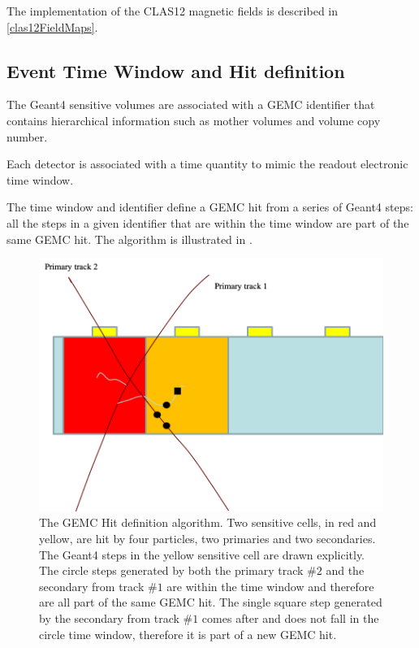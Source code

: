 The implementation of the CLAS12 magnetic fields is described in \ref{clas12FieldMaps}.

\subsection{Event Time Window and Hit definition}
The Geant4 sensitive volumes are associated with a GEMC identifier that contains hierarchical information such as mother volumes
and volume copy number.

Each detector is associated with a time quantity to mimic the readout electronic time window.

The time window and identifier define a GEMC hit from a series of Geant4 steps: all the steps in a given identifier that are within the time window
are part of the same GEMC hit. The algorithm is illustrated in .

\begin{figure}
	\centering
	\includegraphics[width=0.95\columnwidth,keepaspectratio]{img/hitDefinition.png}
	\caption{The GEMC Hit definition algorithm. Two sensitive cells, in red and yellow, are hit by four particles, two primaries and two secondaries.
             The Geant4 steps in the yellow sensitive cell are drawn explicitly. The circle steps generated by both the primary track $\#2$ and the secondary
             from track $\#1$ are within the time window and therefore are all part of the same GEMC hit. The single square step generated by the secondary
             from track $\#1$ comes after and does not fall in the circle time window, therefore it is part of a new GEMC hit.}
	\label{fig:hitDefinition}
\end{figure}

